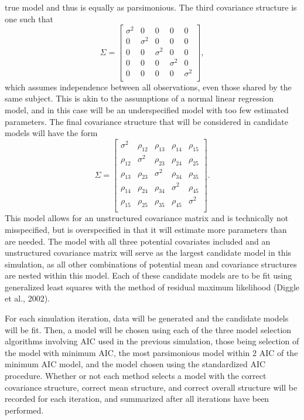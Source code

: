 		true model and thus is equally as parsimonious. The third covariance structure is one such that 
				\begin{equation}
			\Sigma = 
			\begin{bmatrix}
				\sigma^2 & 0 & 0 & 0 & 0 \\
				0 & \sigma^2 & 0 & 0 & 0 \\
				0 & 0 & \sigma^2 & 0 & 0 \\
				0 & 0 & 0 & \sigma^2 & 0 \\
				0 & 0 & 0 & 0 & \sigma^2 \\
			\end{bmatrix}
			,
		\end{equation}
		which assumes independence between all observations, even those shared by the same subject. This is akin to the assumptions of a normal linear regression model, and in this case will be
		an underspecified model with too few estimated parameters. The final covariance structure that will be considered in candidate models will have the form
		\begin{equation}
			\Sigma = 
			\begin{bmatrix}
				\sigma^2 & \rho_{12} & \rho_{13} & \rho_{14} & \rho_{15} \\
				\rho_{12} & \sigma^2 & \rho_{23} & \rho_{24} & \rho_{25} \\
				\rho_{13} & \rho_{23} & \sigma^2 & \rho_{34} & \rho_{35} \\
				\rho_{14} & \rho_{24} & \rho_{34} & \sigma^2 & \rho_{45} \\
				\rho_{15} & \rho_{25} & \rho_{35} & \rho_{45} & \sigma^2 \\
			\end{bmatrix}
			.
		\end{equation}
		This model allows for an unstructured covariance matrix and is technically not misspecified, but is overspecified in that it will estimate more parameters than are needed. The model
		with all three potential covariates included and an unstructured covariance matrix will serve as the largest candidate model in this simulation, as all other combinations of potential
		mean and covariance structures are nested within this model. Each of these candidate models are to be fit using generalized least squares with the method of residual maximum likelihood (Diggle et al., 2002).

		For each simulation iteration, data will be generated and the candidate models will be fit. Then, a model will be chosen using each of the three model selection algorithms involving
		AIC used in the previous simulation, those being selection of the model with minimum AIC, the most parsimonious model within 2 AIC of the minimum AIC model, and the model chosen using the
		standardized AIC procedure. Whether or not each method selects a model with the correct covariance structure, correct mean structure, and correct overall structure will be recorded for each iteration, and
		summarized after all iterations have been performed.

